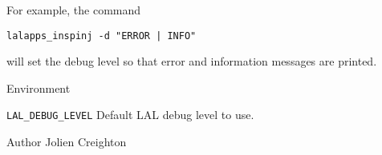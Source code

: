 \begin{entry}
For example, the command
\begin{indented}
\verb$lalapps_inspinj -d "ERROR | INFO"$
\end{indented}
will set the debug level so that error and information messages are printed.

\item[Environment]\leavevmode

\begin{entry}
\item[\texttt{LAL\_DEBUG\_LEVEL}]
Default LAL debug level to use.
\end{entry}

\item[Author]
Jolien Creighton

\end{entry}
